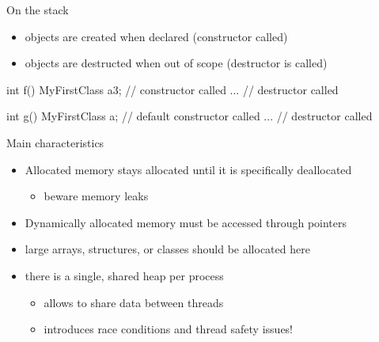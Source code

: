 \begin{frame}[fragile]
  \begin{block}{On the stack}
    \begin{itemize}
    \item objects are created when declared (constructor called)
    \item objects are destructed when out of scope (destructor is called)
    \end{itemize}
  \end{block}
  \begin{cppcode}
    int f() {
      MyFirstClass a{3}; // constructor called
      ...
    } // destructor called

    int g() {
      MyFirstClass a; // default constructor called
      ...
    }  // destructor called
  \end{cppcode}
\end{frame}

\begin{frame}[fragile]
  \begin{block}{Main characteristics}
    \begin{itemize}
    \item Allocated memory stays allocated until it is specifically deallocated
      \begin{itemize}
      \item beware memory leaks
      \end{itemize}
    \item Dynamically allocated memory must be accessed through pointers
    \item large arrays, structures, or classes should be allocated here
    \item there is a single, shared heap per process
      \begin{itemize}
      \item allows to share data between threads
      \item introduces race conditions and thread safety issues!
      \end{itemize}
    \end{itemize}
  \end{block}
\end{frame}

